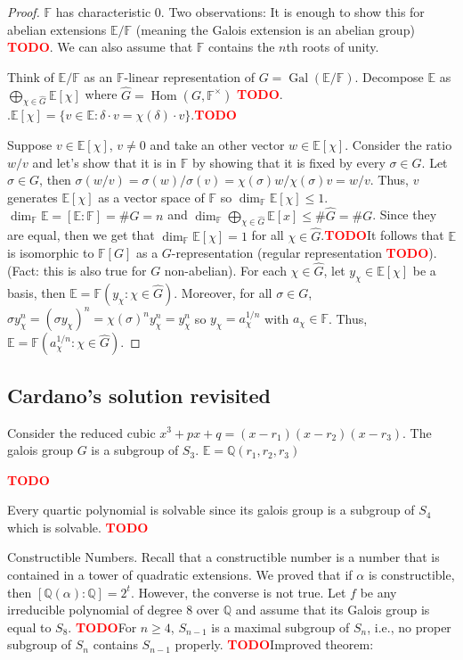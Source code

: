 \documentclass{article}
\theoremstyle{plain}
\theoremstyle{definition}
\newcommand{\Q}{\mathbb{Q}}
\newcommand{\F}{\mathbb{F}}
\newcommand{\E}{\mathbb{E}}
\DeclareMathOperator{\Hom}{Hom}
\DeclareMathOperator{\Gal}{Gal}
\newcommand{\td}{\textcolor{red}{\textbf{TODO}}}
\begin{document}
\begin{proof}
    $\F$ has characteristic 0. Two observations: It is enough to show this for abelian extensions $\E / \F$ (meaning the Galois extension is an abelian group) \td. We can also assume that $\F$ contains the $n$th roots of unity.

    Think of $\E / \F$ as an $\F$-linear representation of $G = \Gal(\E / \F)$. Decompose $\E$ as $\bigoplus_{\chi \in \hat{G}}\E[\chi]$ where $\hat{G} = \Hom(G, \F^{\times})$ \td. $.\E[\chi]= \{v \in \E : \delta \cdot v = \chi(\delta) \cdot v\}$.\td

    Suppose $v \in \E[\chi]$, $v\neq 0$ and take an other vector $w \in \E[\chi]$. Consider the ratio $w / v$ and let's show that it is in $\F$ by showing that it is fixed by every $\sigma \in G$. Let $\sigma \in G$, then $\sigma(w/v) = \sigma (w) / \sigma (v) = \chi(\sigma)w/\chi(\sigma)v = w/v$. Thus, $v$ generates $\E[\chi]$ as a vector space of $\F$ so $\dim_{\F}\E[\chi] \leq 1$. $\dim_{\F}\E = [\E : \F] = \# G = n$ and $\dim_{\F}\bigoplus_{\chi \in \hat{G}}\E[x] \leq \# \hat{G} = \# G$. Since they are equal, then we get that $\dim_{\F}\E[\chi] = 1$ for all $\chi \in \hat{G}$.\td It follows that $\E$ is isomorphic to $\F[G]$ as a $G$-representation (regular representation \td). (Fact: this is also true for $G$ non-abelian). For each $\chi \in \hat{G}$, let $y_{\chi} \in \E[\chi]$ be a basis, then $\E = \F(y_{\chi} : \chi \in \hat{G})$. Moreover, for all $\sigma \in G$, $\sigma y_{\chi}^n =(\sigma y_{\chi})^n = \chi(\sigma)^n y_{\chi}^n = y_{\chi}^n$ so $y_{\chi} = a_{\chi}^{1/n}$ with $a_{\chi} \in \F$. Thus, $\E = \F(a_{\chi}^{1/n} : \chi \in \hat{G})$.
\end{proof}


\subsection{Cardano's solution revisited}

Consider the reduced cubic $x^3 + px + q = (x-r_1)(x-r_2)(x-r_3)$. The galois group $G$ is a subgroup of $S_3$. $\E = \Q(r_1, r_2, r_3)$

\td 


Every quartic polynomial is solvable since its galois group is a subgroup of $S_4$ which is solvable. \td 


Constructible Numbers. Recall that a constructible number is a number that is contained in a tower of quadratic extensions. We proved that if $\alpha$ is constructible, then $[\Q(\alpha) : \Q] = 2^t$. However, the converse is not true. Let $f$ be any irreducible polynomial of degree 8 over $\Q$ and assume that its Galois group is equal to $S_8$. \td For $n \geq 4$, $S_{n-1}$ is a maximal subgroup of $S_n$, i.e., no proper subgroup of $S_n$ contains $S_{n-1}$ properly. \td Improved theorem: 
\end{document}
